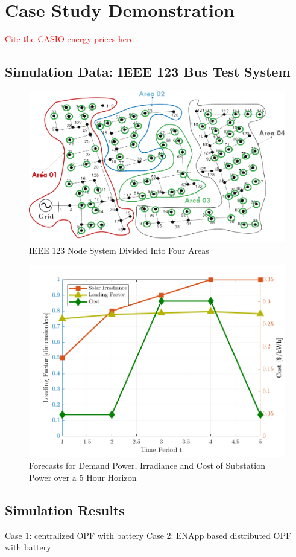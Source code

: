 \documentclass[../../outputs/main.tex]{subfiles}
\begin{document}
\section{Case Study Demonstration}

\textcolor{red}{Cite the CASIO energy prices here}
\subsection{Simulation Data: IEEE 123 Bus Test System}

\begin{figure}[h!]
    \centering
    \includegraphics[width=\linewidth]{../figures/ieee123-FourAreas.png}
    \caption{IEEE 123 Node System Divided Into Four Areas}
    \label{fig:ieee123-four-area-figure}
\end{figure}

\begin{figure}[h!]
    \centering
    \includegraphics[height=0.25\textheight]{../figures/T5-inputCurves/InputCurves_Horizon_5.png}
    \caption{Forecasts for Demand Power, Irradiance and Cost of Substation Power over a 5 Hour Horizon}
    \label{fig:inputCurve-5}
\end{figure}

\subsection{Simulation Results}
Case 1: centralized OPF with battery
Case 2: ENApp based distributed OPF with battery
\end{document}
